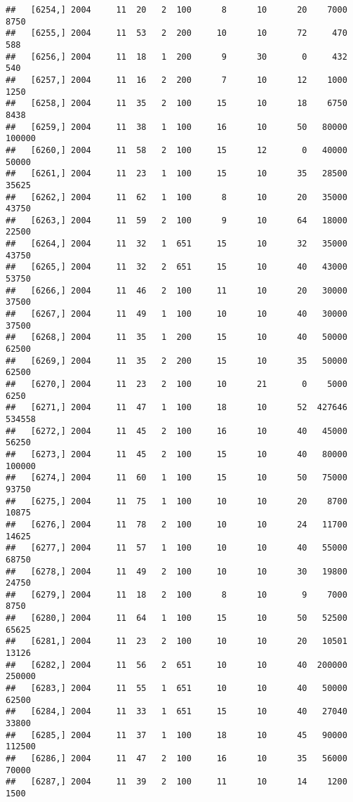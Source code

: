 \documentclass{article}\usepackage[]{graphicx}\usepackage[]{color}
\makeatletter
\newenvironment{kframe}{%
 \def\at@end@of@kframe{}%
 \ifinner\ifhmode%
  \def\at@end@of@kframe{\end{minipage}}%
  \begin{minipage}{\columnwidth}%
 \fi\fi%
 \def\FrameCommand##1{\hskip\@totalleftmargin \hskip-\fboxsep
 \colorbox{shadecolor}{##1}\hskip-\fboxsep
     \hskip-\linewidth \hskip-\@totalleftmargin \hskip\columnwidth}%
 \MakeFramed {\advance\hsize-\width
   \@totalleftmargin\z@ \linewidth\hsize
   \@setminipage}}%
 {\par\unskip\endMakeFramed%
 \at@end@of@kframe}
\newenvironment{knitrout}{}{} %
\makeatother
\begin{document}
\begin{knitrout}
\begin{kframe}
\begin{verbatim}
##   [6254,] 2004     11  20   2  100      8      10      20    7000    8750
##   [6255,] 2004     11  53   2  200     10      10      72     470     588
##   [6256,] 2004     11  18   1  200      9      30       0     432     540
##   [6257,] 2004     11  16   2  200      7      10      12    1000    1250
##   [6258,] 2004     11  35   2  100     15      10      18    6750    8438
##   [6259,] 2004     11  38   1  100     16      10      50   80000  100000
##   [6260,] 2004     11  58   2  100     15      12       0   40000   50000
##   [6261,] 2004     11  23   1  100     15      10      35   28500   35625
##   [6262,] 2004     11  62   1  100      8      10      20   35000   43750
##   [6263,] 2004     11  59   2  100      9      10      64   18000   22500
##   [6264,] 2004     11  32   1  651     15      10      32   35000   43750
##   [6265,] 2004     11  32   2  651     15      10      40   43000   53750
##   [6266,] 2004     11  46   2  100     11      10      20   30000   37500
##   [6267,] 2004     11  49   1  100     10      10      40   30000   37500
##   [6268,] 2004     11  35   1  200     15      10      40   50000   62500
##   [6269,] 2004     11  35   2  200     15      10      35   50000   62500
##   [6270,] 2004     11  23   2  100     10      21       0    5000    6250
##   [6271,] 2004     11  47   1  100     18      10      52  427646  534558
##   [6272,] 2004     11  45   2  100     16      10      40   45000   56250
##   [6273,] 2004     11  45   2  100     15      10      40   80000  100000
##   [6274,] 2004     11  60   1  100     15      10      50   75000   93750
##   [6275,] 2004     11  75   1  100     10      10      20    8700   10875
##   [6276,] 2004     11  78   2  100     10      10      24   11700   14625
##   [6277,] 2004     11  57   1  100     10      10      40   55000   68750
##   [6278,] 2004     11  49   2  100     10      10      30   19800   24750
##   [6279,] 2004     11  18   2  100      8      10       9    7000    8750
##   [6280,] 2004     11  64   1  100     15      10      50   52500   65625
##   [6281,] 2004     11  23   2  100     10      10      20   10501   13126
##   [6282,] 2004     11  56   2  651     10      10      40  200000  250000
##   [6283,] 2004     11  55   1  651     10      10      40   50000   62500
##   [6284,] 2004     11  33   1  651     15      10      40   27040   33800
##   [6285,] 2004     11  37   1  100     18      10      45   90000  112500
##   [6286,] 2004     11  47   2  100     16      10      35   56000   70000
##   [6287,] 2004     11  39   2  100     11      10      14    1200    1500

\end{verbatim}
\end{kframe}
\end{knitrout}
\end{document}
